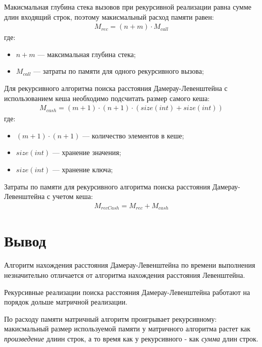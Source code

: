 Макисмальная глубина стека вызовов при рекурсивной реализации равна сумме длин входящий строк, поэтому макисмальный расход памяти равен:
\begin{equation}
	\label{}
	\begin{aligned}
		M_{rec} = (n + m) \cdot M_{call}
	\end{aligned}
\end{equation}
где: 
\begin{itemize}
        \item $n + m$ --- максимальная глубина стека;
	\item $M_{call}$ --- затраты по памяти для одного рекурсивного вызова;
\end{itemize}

Для рекурсивного алгоритма поиска расстояния Дамерау-Левенштейна с использованием кеша необходимо подсчитать размер самого кеша:
\begin{equation}
	\label{}
	\begin{aligned}
		M_{cash} = (m + 1) \cdot (n + 1) \cdot (size(int) + size(int))
	\end{aligned}
\end{equation}
где: 
\begin{itemize}
        \item $(m + 1) \cdot (n + 1)$ --- количество элементов в кеше;
	\item $size(int)$ --- хранение значения;
	\item $size(int)$ --- хранение ключа;
\end{itemize}

Затраты по памяти для рекурсивного алгоритма поиска расстояния Дамерау-Левенштейна с учетом кеша: 
\begin{equation}
	\label{}
	\begin{aligned}
		M_{recCash} = M_{rec} + M_{cash}
	\end{aligned}
\end{equation}

\section{Вывод}

Алгоритм нахождения расстояния Дамерау-Левенштейна по времени выполнения незначительно отличается от алгоритма нахождения расстояния Левенштейна.

Рекурсивные реализации поиска расстояния Дамерау-Левенштейна работают на порядок дольше матричной реализации.

По расходу памяти матричный алгоритм проигрывает рекурсивному: макисмальный размер используемой памяти у матричного алгоритма растет как \textit{произведение} длиин строк, а то время как у рекурсивного - как \textit{сумма} длин строк.